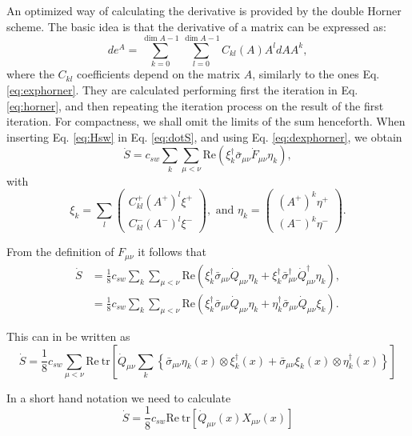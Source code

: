 \documentclass[12pt]{article}
\newcommand{\tr}{\mathrm{tr}}
\newcommand{\re}{\mathrm{Re}}
\begin{document}
An optimized way of calculating the derivative is provided by the double Horner scheme. The basic idea is that the derivative of a matrix can be expressed as:
\begin{equation}
d e^A = \sum_{k=0}^{\dim A -1} \sum_{l=0}^{\dim A-1} C_{kl}(A) A^l dA A^k, \label{eq:dexphorner}
\end{equation}
where  the $C_{kl}$ coefficients depend on the matrix $A$, similarly to the ones Eq. \ref{eq:exphorner}. They are calculated performing first the iteration in Eq. \ref{eq:horner}, and then repeating the iteration process on the result of the first iteration. For compactness, we shall omit the limits of the sum henceforth. When inserting Eq. \eqref{eq:Hsw} in Eq. \eqref{eq:dotS}, and using Eq. \eqref{eq:dexphorner}, we obtain
\begin{equation}
 \dot{S} = c_{sw} \sum_{k}  \sum_{\mu<\nu}\re(  \xi_k^\dagger\bar{\sigma}_{\mu\nu}\dot{F}_{\mu\nu}\eta_k),
\end{equation}
with
\begin{equation}
\xi_k = \sum_l \begin{pmatrix}
C^+_{kl} (A^+)^l \xi^+ \\
C^-_{kl} (A^-)^l \xi^-
\end{pmatrix}, \text{ and }
\eta_k =  \begin{pmatrix}
 (A^+)^k \eta^+ \\
(A^-)^k \eta^-
\end{pmatrix}.
\end{equation}


From the definition of $F_{\mu\nu}$ it follows that
\begin{align}
 \dot{S} &=  \frac{1}{8}c_{sw}\sum_k \sum_{\mu<\nu}\re(\xi_k^\dagger\bar{\sigma}_{\mu\nu}\dot{Q}_{\mu\nu}\eta_k + \xi_k^\dagger\bar{\sigma}_{\mu\nu}^\dagger\dot{Q}_{\mu\nu}^\dagger\eta_k), \\
 &=
 \frac{1}{8}c_{sw}\sum_k \sum_{\mu<\nu}\re(\xi_k^\dagger\bar{\sigma}_{\mu\nu}\dot{Q}_{\mu\nu}\eta_k + \eta_k^\dagger\bar{\sigma}_{\mu\nu}\dot{Q}_{\mu\nu}\xi_k).
\end{align}

This can in be written as
\begin{equation}
 \dot{S} = \frac{1}{8}c_{sw}\sum_{\mu<\nu} \re~\tr\left[\dot{Q}_{\mu\nu} \sum_k\left\{\bar{\sigma}_{\mu\nu}\eta_k(x)\otimes\xi_k^\dagger(x) + \bar{\sigma}_{\mu\nu}\xi_k(x)\otimes\eta_k^\dagger(x)\right\}\right]
\end{equation}

In a short hand notation we need to calculate
\begin{equation}
 \dot{S} = \frac{1}{8}c_{sw}\re~\tr[\dot{Q}_{\mu\nu}(x)X_{\mu\nu}(x)]
 \label{eq:force}
\end{equation}
\end{document}
